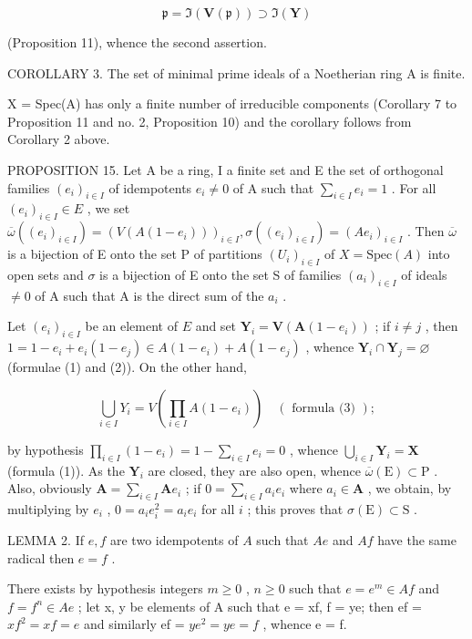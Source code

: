 \[
\mathfrak {p} = \Im (\mathbf {V} (\mathfrak {p})) \supset \Im (\mathbf {Y})
\]

(Proposition 11), whence the second assertion.

COROLLARY 3. The set of minimal prime ideals of a Noetherian ring A is finite.

X = Spec(A) has only a finite number of irreducible components (Corollary 7 to Proposition 11 and no. 2, Proposition 10) and the corollary follows from Corollary 2 above.

PROPOSITION 15. Let A be a ring, I a finite set and E the set of orthogonal families \((e_i)_{i \in I}\) of idempotents \(e_i \neq 0\) of A such that \(\sum_{i \in I} e_i = 1\) . For all \((e_i)_{i \in I} \in E\) , we set \(\overline{\omega}((e_i)_{i \in I}) = (V(A(1 - e_i)))_{i \in I}, \sigma((e_i)_{i \in I}) = (Ae_i)_{i \in I}\) . Then \(\overline{\omega}\) is a bijection of E onto the set P of partitions \((U_i)_{i \in I}\) of \(X = \text{Spec}(A)\) into open sets and \(\sigma\) is a bijection of E onto the set S of families \((a_i)_{i \in I}\) of ideals \(\neq 0\) of A such that A is the direct sum of the \(a_i\) .

Let \((e_i)_{i\in I}\) be an element of \(E\) and set \(\mathbf{Y}_i = \mathbf{V}(\mathbf{A}(1 - e_i))\) ; if \(i\neq j\) , then \(1 = 1 - e_i + e_i(1 - e_j)\in A(1 - e_i) + A(1 - e_j)\) , whence \(\mathbf{Y}_i\cap \mathbf{Y}_j = \varnothing\) (formulae (1) and (2)). On the other hand,

\[
\bigcup_ {i \in I} Y _ {i} = V \left(\prod_ {i \in I} A (1 - e _ {i})\right) \quad (\text { formula   (3) });
\]

by hypothesis \(\prod_{i\in I}(1 - e_i) = 1 - \sum_{i\in I}e_i = 0\) , whence \(\bigcup_{i\in I}\mathbf{Y}_i = \mathbf{X}\) (formula (1)). As the \(\mathbf{Y}_i\) are closed, they are also open, whence \(\overline{\omega} (\mathrm{E})\subset \mathrm{P}\) . Also, obviously \(\mathbf{A} = \sum_{i\in I}\mathbf{A}e_i\) ; if \(0 = \sum_{i\in I}a_{i}e_{i}\) where \(a_{i}\in \mathbf{A}\) , we obtain, by multiplying by \(e_i\) , \(0 = a_i e_i^2 = a_i e_i\) for all \(i\) ; this proves that \(\sigma (\mathrm{E})\subset \mathrm{S}\) .

LEMMA 2. If \(e, f\) are two idempotents of \(A\) such that \(Ae\) and \(Af\) have the same radical then \(e = f\) .

There exists by hypothesis integers \(m \geqslant 0\) , \(n \geqslant 0\) such that \(e = e^{m} \in Af\) and \(f = f^{n} \in Ae\) ; let x, y be elements of A such that e = xf, f = ye; then ef = \(xf^{2} = xf = e\) and similarly ef = \(ye^{2} = ye = f\) , whence e = f.

